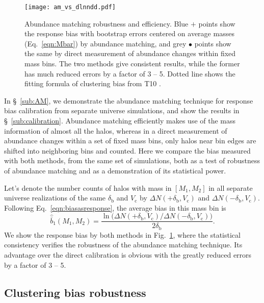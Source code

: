 \documentclass[prd,twocolumn,amsmath,amssymb,floatfix,superscriptaddress]{revtex4-1}
\newcommand{\br}{\textrm{b}}
\newcommand{\VL}{V_\textrm{c}}
\begin{document}
\begin{figure}[tb]
    \centering
    \texttt{[image: am\_vs\_dlnndd.pdf]}
    \caption{\footnotesize 
        Abundance matching robustness and efficiency.
        Blue $+$ points show the response bias with bootstrap errors
        centered on average masses (Eq.~\ref{eqn:Mbar}) by abundance matching,
        and grey {\tiny $\bullet$} points show the same by direct measurement of abundance changes
        within fixed mass bins.
        The two methods give consistent results, while the former has much reduced
        errors by a factor of 3 -- 5.
        Dotted line shows the fitting formula of clustering bias from T10 \cite{Tinkeretal:10}.
    }
    \label{fig:am_vs_dlnndd}
\end{figure}

In \S~\ref{sub:AM}, we demonstrate the abundance matching technique for response bias calibration
from separate universe simulations, and show the results in \S~\ref{sub:calibration}.
Abundance matching efficiently makes use of the mass information of almost all the halos,
whereas in a direct measurement of abundance changes within a set of fixed mass bins,
only halos near bin edges are shifted into neighboring bins and counted.
Here we compare the bias measured with both methods, from the same set of simulations,
both as a test of robustness of abundance matching and as a demonstration of its
statistical power.  

 
Let's denote the number counts of halos with mass in $[M_1, M_2]$
in all separate universe realizations
of the same $\delta_\br$ and $\VL$
by $\Delta N(+\delta_\br,\VL)$ and $\Delta N(-\delta_\br,\VL)$.
Following Eq.~\ref{eqn:biasasresponse}, the average bias in this mass bin is
\begin{equation}
    \hat{\bar b}_1(M_1, M_2) =
    \frac{\ln\big(\Delta N(+\delta_\br, \VL)\big/\Delta N(-\delta_\br, \VL)\big)}{2\delta_\br}.
\end{equation}
We show the response bias by both methods in Fig.~\ref{fig:am_vs_dlnndd},
where the statistical consistency verifies the robustness of the abundance matching technique.
Its advantage over the direct calibration is obvious with the greatly reduced
errors by a factor of 3 -- 5.




\subsection{Clustering bias robustness}
\label{sub:clusteringrobust}
\end{document}
